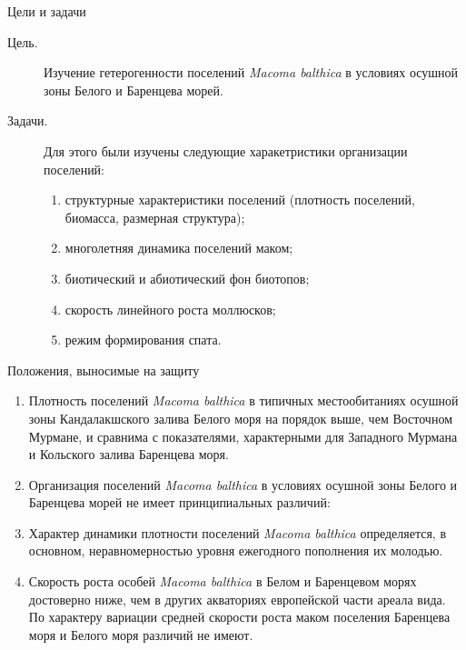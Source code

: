 \documentclass{beamer}
\begin{document}
\begin{frame}{Цели и задачи}
\begin{description}
	\item[Цель.] Изучение гетерогенности поселений {\it Macoma balthica} в условиях осушной зоны Белого и Баренцева морей.

	\item[Задачи.]
Для этого были изучены следующие харакетристики организации поселений:
  \begin{enumerate}
    \item структурные характеристики поселений (плотность поселений, биомасса, размерная структура);
    \item многолетняя динамика поселений маком;
    \item биотический и абиотический фон биотопов;
    \item скорость линейного роста моллюсков;
    \item режим формирования спата.
  \end{enumerate}
\end{description}
\end{frame}


\begin{frame}{Положения, выносимые на защиту}
\begin{scriptsize}
\begin{enumerate}
\item Плотность поселений \textit{Macoma balthica} в типичных местообитаниях осушной зоны Кандалакшского залива Белого моря на порядок выше, чем Восточном Мурмане, и сравнима с показателями, характерными для Западного Мурмана и Кольского залива Баренцева моря. 
\item Организация поселений  \textit{Macoma balthica} в условиях осушной зоны Белого и Баренцева морей не имеет принципиальных различий:
	\begin{itemize}
	\end{itemize}
\item Характер динамики плотности поселений \textit{Macoma balthica} определяется, в основном, неравномерностью  уровня ежегодного пополнения их молодью. 
\item Скорость роста особей \textit{Macoma balthica} в Белом и Баренцевом морях достоверно ниже, чем в других акваториях европейской части ареала вида. 
По характеру вариации средней скорости роста маком поселения Баренцева моря и Белого моря различий не имеют. 
\end{enumerate}
\end{scriptsize}
\end{frame}
\end{document}
